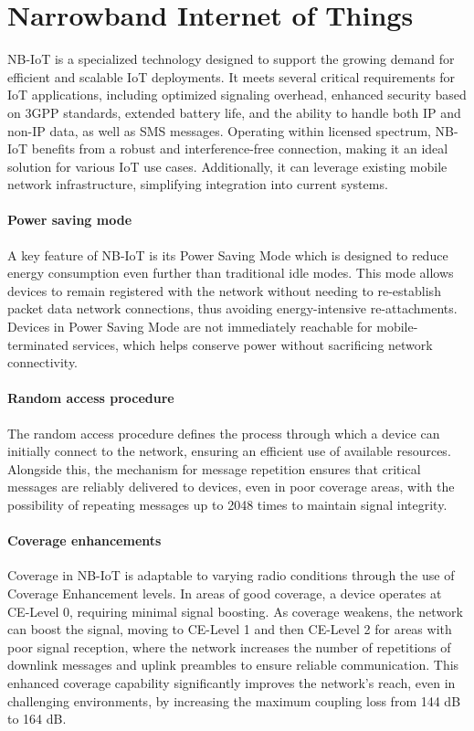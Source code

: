 \section{Narrowband Internet of Things}

NB-IoT is a specialized technology designed to support the growing demand for efficient and scalable IoT deployments. 
It meets several critical requirements for IoT applications, including optimized signaling overhead, enhanced security based on 3GPP standards, extended battery life, and the ability to handle both IP and non-IP data, as well as SMS messages. 
Operating within licensed spectrum, NB-IoT benefits from a robust and interference-free connection, making it an ideal solution for various IoT use cases. 
Additionally, it can leverage existing mobile network infrastructure, simplifying integration into current systems.

\paragraph*{Power saving mode}
A key feature of NB-IoT is its Power Saving Mode which is designed to reduce energy consumption even further than traditional idle modes.
This mode allows devices to remain registered with the network without needing to re-establish packet data network connections, thus avoiding energy-intensive re-attachments. 
Devices in Power Saving Mode are not immediately reachable for mobile-terminated services, which helps conserve power without sacrificing network connectivity. 

\paragraph*{Random access procedure}
The random access procedure defines the process through which a device can initially connect to the network, ensuring an efficient use of available resources. 
Alongside this, the mechanism for message repetition ensures that critical messages are reliably delivered to devices, even in poor coverage areas, with the possibility of repeating messages up to 2048 times to maintain signal integrity.

\paragraph*{Coverage enhancements}
Coverage in NB-IoT is adaptable to varying radio conditions through the use of Coverage Enhancement levels. 
In areas of good coverage, a device operates at CE-Level 0, requiring minimal signal boosting. 
As coverage weakens, the network can boost the signal, moving to CE-Level 1 and then CE-Level 2 for areas with poor signal reception, where the network increases the number of repetitions of downlink messages and uplink preambles to ensure reliable communication. 
This enhanced coverage capability significantly improves the network's reach, even in challenging environments, by increasing the maximum coupling loss from 144 dB to 164 dB.

